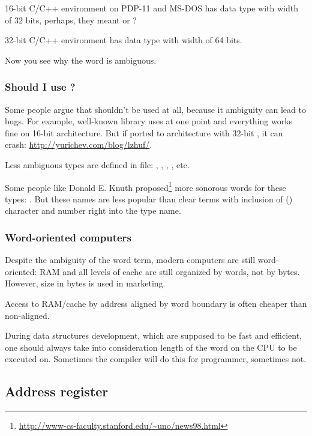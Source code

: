 16-bit C/C++ environment on PDP-11 and MS-DOS has  data type with width of 32 bits, perhaps,
they meant  or ?

32-bit C/C++ environment has  data type with width of 64 bits.

Now you see why the  word is ambiguous.

\subsubsection{Should I use ?}

Some people argue that  shouldn't be used at all, because it ambiguity can lead to bugs.
For example, well-known  library uses  at one point and everything works fine on 16-bit architecture.
But if ported to architecture with 32-bit , it can crash: \url{http://yurichev.com/blog/lzhuf/}.

Less ambiguous types are defined in  file:
, , , , etc.

Some people like Donald E. Knuth proposed\footnote{\url{http://www-cs-faculty.stanford.edu/~uno/news98.html}}
more sonorous words
for these types: .
But these names are less popular than clear terms with inclusion of  () character 
and number right into the type name.

\subsubsection{Word-oriented computers}

Despite the ambiguity of the \gls{word} term, modern computers are still word-oriented: \ac{RAM} and all levels of cache
are still organized by words, not by bytes.
However, size in bytes is used in marketing.

Access to RAM/cache by address aligned by word boundary is often cheaper than non-aligned.

During data structures development, which are supposed to be fast and efficient,
one should always take into consideration length of the \gls{word} on the CPU to be executed on.
Sometimes the compiler will do this for programmer, sometimes not.

\subsection{Address register}

